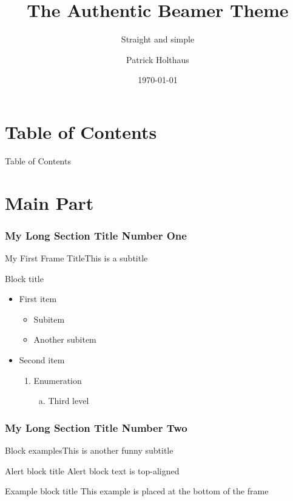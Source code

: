 \documentclass[utf8,compress,aspectratio=169]{beamer}
\title{The Authentic Beamer Theme}
\subtitle{Straight and simple}
\author{Patrick Holthaus}
\date{\today}
\begin{document}
\titleframe

\part{Table of Contents}
\begin{frame}{Table of Contents}{}
    \tableofcontents
\end{frame}

\part{Main Part}
\section[First Section Title]{My Long Section Title Number One}
\begin{frame}[<+->][c]{My First Frame Title}{This is a subtitle}
\begin{block}{Block title}
  \begin{itemize}
    \item First item
    \begin{itemize}
        \item Subitem
        \item Another subitem
    \end{itemize}
    \item Second item
    \begin{enumerate}[1]
        \item Enumeration
        \begin{enumerate}[a)]
        \item Third level
    \end{enumerate}
    \end{enumerate}
  \end{itemize}
  \end{block}
\end{frame}

\section[Second Section Title]{My Long Section Title Number Two}
\begin{frame}[<+->][t]{Block examples}{This is another funny subtitle}
\begin{alertblock}{Alert block title}
    Alert block text is top-aligned
\end{alertblock}
\tobottom
\begin{exampleblock}{Example block title}
    This example is placed at the bottom of the frame
\end{exampleblock}
\end{frame}
\end{document}
